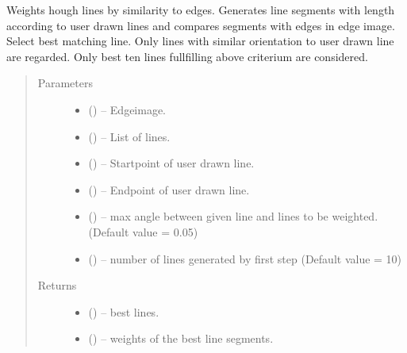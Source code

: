 \documentclass[letterpaper,10pt,english]{sphinxmanual}
\begin{document}

\begin{fulllineitems}
\label{\detokenize{image_lines:image_lines.weight_lines}}
Weights hough lines by similarity to edges.
Generates line segments with length according to user drawn lines and
compares segments with edges in edge image. Select best matching line.
Only lines with similar orientation to user drawn line are regarded.
Only best ten lines fullfilling above criterium are considered.
\begin{quote}\begin{description}
\item[{Parameters}] \leavevmode\begin{itemize}
\item {} 
 () -- Edgeimage.

\item {} 
 () -- List of lines.

\item {} 
 () -- Startpoint of user drawn line.

\item {} 
 () -- Endpoint of user drawn line.

\item {} 
 () -- max angle between given line and lines to be weighted. (Default value = 0.05)

\item {} 
 () -- number of lines generated by first step (Default value = 10)

\end{itemize}

\item[{Returns}] \leavevmode
\begin{itemize}
\item {} 
 () -- best lines.

\item {} 
 () -- weights of the best line segments.

\end{itemize}


\end{description}\end{quote}

\end{fulllineitems}
\end{document}
